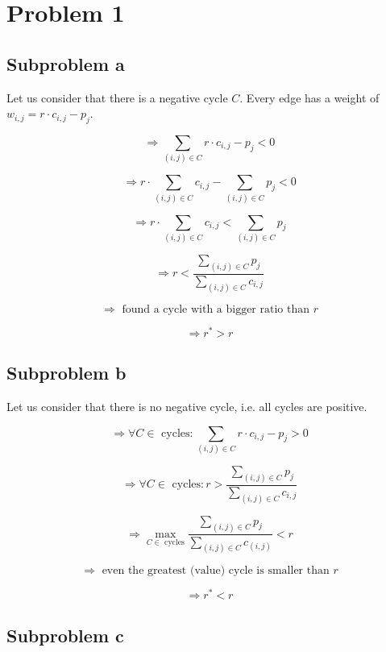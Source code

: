 \documentclass[12pt]{article}
\begin{document}
\section*{Problem 1}

\subsection*{Subproblem a}
Let us consider that there is a negative cycle $C$. Every edge has a weight of $w_{i, j} = r \cdot c_{i,j} - p_j$.

$$ \Rightarrow \sum_{(i, j) \in C} r \cdot c_{i, j} - p_j < 0 $$

$$ \Rightarrow r \cdot \sum_{(i, j) \in C} c_{i, j} - \sum_{(i, j) \in C} p_j < 0 $$

$$ \Rightarrow r \cdot \sum_{(i, j) \in C} c_{i, j} < \sum_{(i, j) \in C} p_j $$

$$ \Rightarrow r < \frac{\sum_{(i, j) \in C} p_j}{\sum_{(i, j) \in C} c_{i, j}} $$

$$ \Rightarrow \mbox{ found a cycle with a bigger ratio than $r$} $$

$$ \Rightarrow r^* > r $$

\subsection*{Subproblem b}
Let us consider that there is no negative cycle, i.e. all cycles are positive.

$$ \Rightarrow \forall C \in \mbox{ cycles}: \sum_{(i, j) \in C} r \cdot c_{i, j} - p_j > 0 $$

$$ \Rightarrow \forall C \in \mbox{ cycles}: r > \frac{\sum_{(i, j) \in C} p_j}{\sum_{(i, j) \in C} c_{i, j}} $$

$$ \Rightarrow \max_{C \in \mbox{ cycles}} \frac{\sum_{(i, j) \in C} p_j}{\sum_{(i, j) \in C} c_(i, j)} < r $$

$$ \Rightarrow \mbox{ even the greatest (value) cycle is smaller than $r$} $$

$$ \Rightarrow r^* < r $$

\subsection*{Subproblem c}
\end{document}

